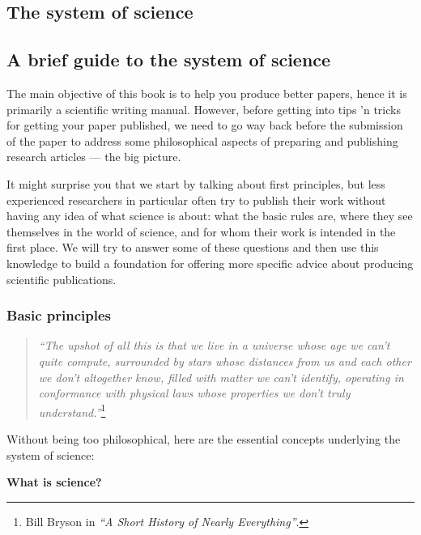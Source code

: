 \documentclass[graybox,envcountchap,sectrefs,UStrade]{svmono}
\begin{document}
\begin{partbacktext}
\part{The system of science}
\end{partbacktext}

\chapter{A brief guide to the system of science}

The main objective of this book is to help you produce better papers, hence it is primarily a scientific writing manual. However, before getting into tips 'n tricks for getting your paper published, we need to go way back before the submission of the paper to address some philosophical aspects of preparing and publishing research articles --- the big picture.\par

It might surprise you that we start by talking about first principles, but less experienced researchers in particular often try to publish their work without having any idea of what science is about: what the basic rules are, where they see themselves in the world of science, and for whom their work is intended in the first place. We will try to answer some of these questions and then use this knowledge to build a foundation for offering more specific advice about producing scientific publications.\par

\section{Basic principles}

\begin{quote}
    \emph{``The upshot of all this is that we live in a universe whose age we can't quite compute, surrounded by stars whose distances from us and each other we don't altogether know, filled with matter we can't identify, operating in conformance with physical laws whose properties we don't truly understand.''}\footnote{Bill Bryson in \emph{``A Short History of Nearly Everything''}.}
\end{quote}

Without being too philosophical, here are the essential concepts underlying the system of science:

\begin{flushleft}
\textbf{What is science?}
\end{flushleft}
\end{document}
